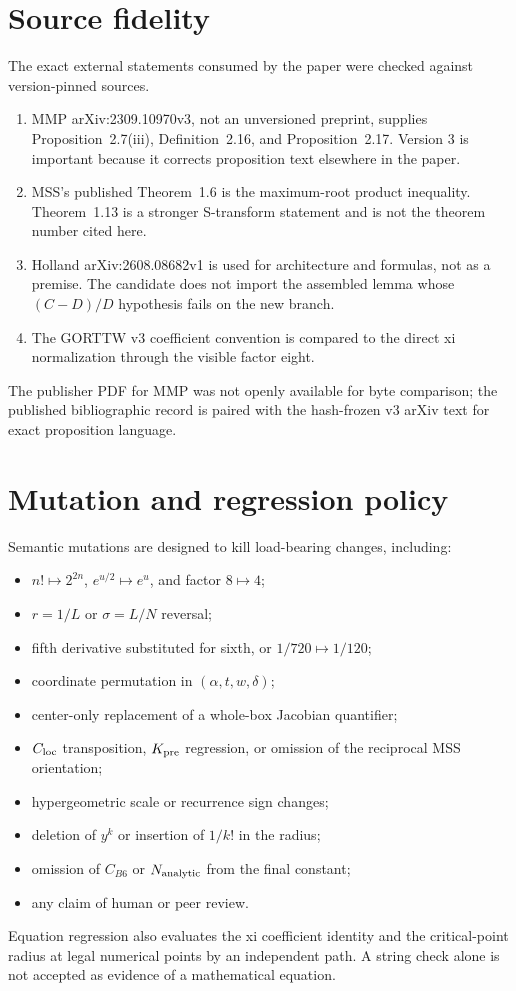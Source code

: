 \documentclass[10pt]{article}
\begin{document}
\section{Source fidelity}\label{sup:sources}

The exact external statements consumed by the paper were checked against
version-pinned sources.
\begin{enumerate}
\item MMP arXiv:2309.10970v3, not an unversioned preprint, supplies
Proposition~2.7(iii), Definition~2.16, and Proposition~2.17.  Version 3 is
important because it corrects proposition text elsewhere in the paper.
\item MSS's published Theorem~1.6 is the maximum-root product inequality.
Theorem~1.13 is a stronger S-transform statement and is not the theorem
number cited here.
\item Holland arXiv:2608.08682v1 is used for architecture and formulas, not
as a premise.  The candidate does not import the assembled lemma whose
$(C-D)/D$ hypothesis fails on the new branch.
\item The GORTTW v3 coefficient convention is compared to the direct xi
normalization through the visible factor eight.
\end{enumerate}
The publisher PDF for MMP was not openly available for byte comparison; the
published bibliographic record is paired with the hash-frozen v3 arXiv text
for exact proposition language.

\section{Mutation and regression policy}\label{sup:mutations}

Semantic mutations are designed to kill load-bearing changes, including:
\begin{itemize}
\item $n!\mapsto2^{2n}$, $e^{u/2}\mapsto e^u$, and factor $8\mapsto4$;
\item $r=1/L$ or $\sigma=L/N$ reversal;
\item fifth derivative substituted for sixth, or $1/720\mapsto1/120$;
\item coordinate permutation in $(\alpha,t,w,\delta)$;
\item center-only replacement of a whole-box Jacobian quantifier;
\item $C_{\rm loc}$ transposition, $K_{\rm pre}$ regression, or omission of
the reciprocal MSS orientation;
\item hypergeometric scale or recurrence sign changes;
\item deletion of $y^k$ or insertion of $1/k!$ in the radius;
\item omission of $C_{B6}$ or $N_{\rm analytic}$ from the final constant;
\item any claim of human or peer review.
\end{itemize}
Equation regression also evaluates the xi coefficient identity and the
critical-point radius at legal numerical points by an independent path.  A
string check alone is not accepted as evidence of a mathematical equation.
\end{document}
